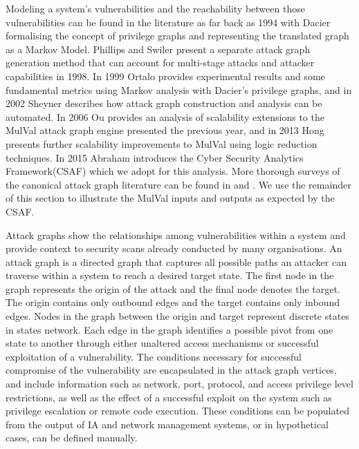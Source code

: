 
Modeling a system's vulnerabilities and the reachability between those vulnerabilities can be found in the literature as far back as 1994 with Dacier\cite{Dacier_1994} formalising the concept of privilege graphs and representing the translated graph as a Markov Model. Phillips and Swiler\cite{Phillips_Swiler_1998} present a separate attack graph generation method that can account for multi-stage attacks and attacker capabilities in 1998. In 1999 Ortalo\cite{Ortalo_1999}  provides experimental results and some fundamental metrics using Markov analysis with Dacier's privilege graphs, and in 2002 Sheyner\cite{Sheyner_Haines_Jha_Lippmann_Wing_2002} describes how attack graph construction and analysis can be automated. In 2006 Ou\cite{Ou_Boyer_McQueen_2006} provides an analysis of scalability extensions to the MulVal\cite{Ou_Govindavajhala_Appel} attack graph engine presented the previous year, and in 2013 Hong\cite{Hong_Kim_Takaoka_2013} presents further scalability improvements to MulVal using logic reduction techniques. In 2015 Abraham\cite{Abraham_Nair_2015b} introduces the Cyber Security Analytics Framework(CSAF) which we adopt for this analysis. More thorough surveys of the canonical attack graph literature can be found in \cite{Kordy_2013} and \cite{Lippmann_Ingols_2005}. We use the remainder of this section to illustrate the MulVal inputs and outputs as expected by the CSAF. 

Attack graphs show the relationships among vulnerabilities within a system and provide context to security scans already conducted by many organisations. An attack graph is a directed graph that captures all possible paths an attacker can traverse within a system to reach a desired target state. The first node in the graph represents the origin of the attack and the final node denotes the target. The origin contains only outbound edges and the target contains only inbound edges. Nodes in the graph between the origin and target represent discrete states in states network. Each edge in the graph identifies a possible pivot from one state to another through either unaltered access mechanisms or successful exploitation of a vulnerability. The conditions necessary for successful compromise of the vulnerability are encapsulated in the attack graph vertices, and include information such as network, port, protocol, and access privilege level restrictions, as well as the effect of a successful exploit on the system such as privilege escalation or remote code execution. These conditions can be populated from the output of IA and network management systems, or in hypothetical cases, can be defined manually.  

